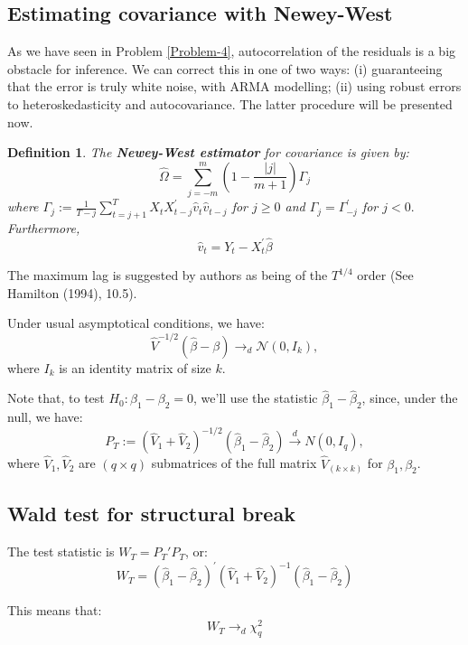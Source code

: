 \documentclass[11pt, a4paper]{report}
\theoremstyle{plain}
\theoremstyle{plain}
\newtheorem{defn}{Definition}[section]
\theoremstyle{remark}
\begin{document}
\subsection{Estimating covariance with Newey-West}

As we have seen in Problem \ref{Problem-4}, autocorrelation of the residuals is a big obstacle for inference. We can correct this in one of two ways: (i) guaranteeing that the error is truly white noise, with ARMA modelling; (ii) using robust errors to heteroskedasticity and autocovariance. The latter procedure will be presented now.

\begin{defn}
The \textbf{Newey-West estimator} for covariance is given by:
$$
\widehat{\Omega}=\sum_{j=-m}^{m}\left(1-\frac{|j|}{m+1}\right) {\Gamma}_{j}
$$
where ${\Gamma}_{j}:=\frac{1}{T-j} \sum_{t=j+1}^{T} {X}_{t} {X}_{t-j}^{\prime} \widehat{v}_{t} \widehat{v}_{t-j}$ for $j \geq 0$ and ${\Gamma}_{j}={\Gamma}_{-j}^{\prime}$ for
$j<0.$
Furthermore,
$$
\widehat{v}_{t}=Y_{t}-{X}_{t}^{\prime} \widehat{\beta}
$$
\end{defn}

The maximum lag is suggested by authors as being of the $T^{1/4}$ order (See Hamilton (1994), 10.5).

Under usual asymptotical conditions, we have:
$$ \hat{V}^{-1/2} (\hat{\beta} - \beta) \to_d \mathcal{N}(0, I_k), $$
where $I_k$ is an identity matrix of size $k$. 

Note that, to test $H_0: \beta_1 - \beta_2 = 0$, we'll use the statistic $\hat{\beta}_1 - \hat{\beta}_2$, since, under the null, we have:
$${P}_{T}:=\left(\widehat{{V}}_{1}+\widehat{{V}}_{2}\right)^{-1 / 2}\left(\widehat{{\beta}}_{1}-\widehat{{\beta}}_{2}\right) \stackrel{d}{\longrightarrow} N\left({0}, I_{q}\right),$$
where $\hat{V}_1, \hat{V}_2$ are $(q \times q)$ submatrices of the full matrix $\hat{V}_{(k \times k)}$ for $\beta_1, \beta_2$.

\subsection{Wald test for structural break}

The test statistic is $W_T = P_T'P_T$, or:
$$W_{T}=\left(\widehat{\beta}_{1}-\widehat{\beta}_{2}\right)^{\prime}\left(\widehat{{V}}_{1}+\widehat{{V}}_{2}\right)^{-1}\left(\widehat{{\beta}}_{1}-\widehat{{\beta}}_{2}\right)$$

This means that:
$$ W_T \to_d \chi_q^2 $$
\end{document}
